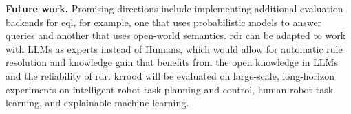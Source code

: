\documentclass{article}
\newcommand{\todo}[1]{\textcolor{red}{\textbf{TODO: #1}}}
\begin{document}
\textbf{Future work.}
Promising directions include implementing additional evaluation backends for \ac{eql}, for example, one that uses probabilistic models to answer queries and another that uses open-world semantics. \ac{rdr} can be adapted to work with LLMs as experts instead of Humans, which would allow for automatic rule resolution and knowledge gain that benefits from the open knowledge in LLMs and the reliability of \ac{rdr}. \Ac{krrood} will be evaluated on large-scale, long-horizon experiments on intelligent robot task planning and control, human-robot task learning, and explainable machine learning. 
\appendix 




\appendix
\end{document}
